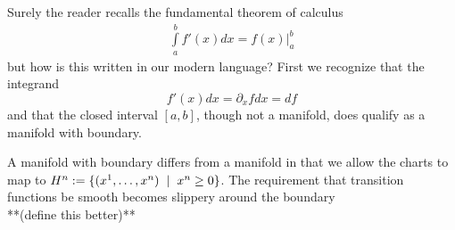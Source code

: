 Surely the reader recalls the fundamental theorem of calculus 
\begin{align*}
	\int\limits_a^b f'(x) dx = f(x)\bigg|^b_a
\end{align*}
but how is this written in our modern language?  First we recognize that the integrand 
\begin{equation*}
	f'(x) dx = \partial_x f dx = df
\end{equation*}
and that the closed interval $[a, b]$, though not a manifold, does qualify as a manifold with boundary.

A manifold with boundary differs from a manifold in that we allow the charts to map to $H^n := \{(x^1, \dots, x^n) \hspace{2mm} | \hspace{2mm}  x^n \geq 0\}$.  The requirement that transition functions be smooth becomes slippery around the boundary\\
**(define this better)**\\

